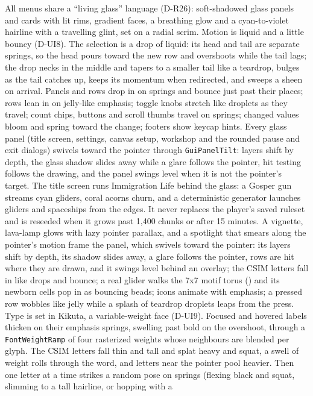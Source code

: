 All menus share a ``living glass'' language (D-R26): soft-shadowed glass
panels and cards with lit rims, gradient faces, a breathing glow and a
cyan-to-violet hairline with a travelling glint, set on a radial scrim. Motion
is liquid and a little bouncy (D-UI8). The selection is a drop of liquid: its
head and tail are separate springs, so the head pours toward the new row and
overshoots while the tail lags; the drop necks in the middle and tapers to a
smaller tail like a teardrop, bulges as the tail catches up, keeps its
momentum when redirected, and sweeps a sheen on arrival. Panels and rows drop
in on springs and bounce just past their places; rows lean in on jelly-like
emphasis; toggle knobs stretch like droplets as they travel; count chips,
buttons and scroll thumbs travel on springs; changed values bloom and spring
toward the change; footers show keycap hints. Every glass panel (title
screen, settings, canvas setup, workshop and the rounded pause and exit
dialogs) swivels toward the pointer through \texttt{GuiPanelTilt}: layers
shift by depth, the glass shadow slides away while a glare follows the
pointer, hit testing follows the drawing, and the panel swings level when it
is not the pointer's target. The title
screen runs Immigration Life behind the glass: a Gosper gun streams cyan
gliders, coral acorns churn, and a deterministic generator launches gliders and
spaceships from the edges. It never replaces the player's saved ruleset and is
reseeded when it grows past 1,400 chunks or after 15 minutes. A vignette,
lava-lamp glows with lazy pointer parallax, and a spotlight that smears along
the pointer's motion frame the panel, which swivels toward the pointer: its
layers shift by depth, its shadow slides away, a glare follows the pointer,
rows are hit where they are drawn, and it swings level behind an overlay; the
CSIM letters fall in like drops and bounce; a real glider walks the 7x7 motif torus () and
its newborn cells pop in as bouncing beads; icons animate with emphasis; a
pressed row wobbles like jelly while a splash of teardrop droplets leaps from
the press.
Type is set in Kikuta, a variable-weight face (D-UI9). Focused and hovered
labels thicken on their emphasis springs, swelling past bold on the overshoot,
through a \texttt{FontWeightRamp} of four rasterized weights whose neighbours
are blended per glyph. The CSIM letters fall thin and tall and splat heavy and
squat, a swell of weight rolls through the word, and letters near the pointer
pool heavier. Then one letter at a time strikes a random pose on springs
(flexing black and squat, slimming to a tall hairline, or hopping with a

